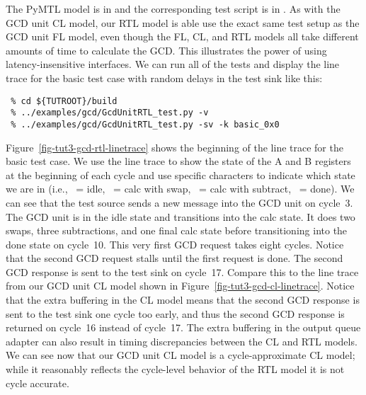 \documentclass{cbxdoc}
\begin{document}

The PyMTL model is in  and the corresponding test script
is in . As with the GCD unit CL model, our RTL
model is able use the exact same test setup as the GCD unit FL model,
even though the FL, CL, and RTL models all take different amounts of time
to calculate the GCD. This illustrates the power of using
latency-insensitive interfaces. We can run all of the tests and display
the line trace for the basic test case with random delays in the test
sink like this:

\begin{verbatim}
 % cd ${TUTROOT}/build
 % ../examples/gcd/GcdUnitRTL_test.py -v
 % ../examples/gcd/GcdUnitRTL_test.py -sv -k basic_0x0
\end{verbatim}

Figure~\ref{fig-tut3-gcd-rtl-linetrace} shows the beginning of the line
trace for the basic test case. We use the line trace to show the state of
the A and B registers at the beginning of each cycle and use specific
characters to indicate which state we are in (i.e., ~= idle,
~= calc with swap, ~= calc with subtract, ~= done).
We can see that the test source sends a new message into the GCD unit on
cycle~3. The GCD unit is in the idle state and transitions into the calc
state. It does two swaps, three subtractions, and one final calc state
before transitioning into the done state on cycle~10. This very first GCD
request takes eight cycles. Notice that the second GCD request stalls
until the first request is done. The second GCD response is sent to the
test sink on cycle~17. Compare this to the line trace from our GCD unit
CL model shown in Figure~\ref{fig-tut3-gcd-cl-linetrace}. Notice that the
extra buffering in the CL model means that the second GCD response is
sent to the test sink one cycle too early, and thus the second GCD
response is returned on cycle~16 instead of cycle~17. The extra buffering
in the output queue adapter can also result in timing discrepancies
between the CL and RTL models. We can see now that our GCD unit CL model
is a cycle-approximate CL model; while it reasonably reflects the
cycle-level behavior of the RTL model it is not cycle accurate.
\end{document}
